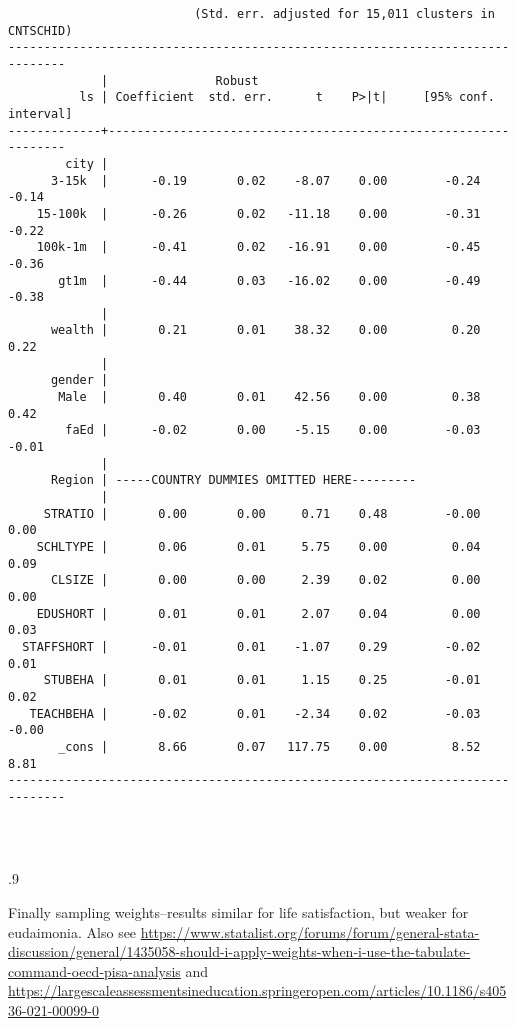 \documentclass[11pt, letterpaper]{article}
\begin{document}
\begin{spacing}{1.9}
\begin{spacing}{.5}
\begin{scriptsize}
\begin{verbatim}
                          (Std. err. adjusted for 15,011 clusters in CNTSCHID)
------------------------------------------------------------------------------
             |               Robust
          ls | Coefficient  std. err.      t    P>|t|     [95% conf. interval]
-------------+----------------------------------------------------------------
        city |
      3-15k  |      -0.19       0.02    -8.07    0.00        -0.24       -0.14
    15-100k  |      -0.26       0.02   -11.18    0.00        -0.31       -0.22
    100k-1m  |      -0.41       0.02   -16.91    0.00        -0.45       -0.36
       gt1m  |      -0.44       0.03   -16.02    0.00        -0.49       -0.38
             |
      wealth |       0.21       0.01    38.32    0.00         0.20        0.22
             |
      gender |
       Male  |       0.40       0.01    42.56    0.00         0.38        0.42
        faEd |      -0.02       0.00    -5.15    0.00        -0.03       -0.01
             |
      Region | -----COUNTRY DUMMIES OMITTED HERE---------
             |
     STRATIO |       0.00       0.00     0.71    0.48        -0.00        0.00
    SCHLTYPE |       0.06       0.01     5.75    0.00         0.04        0.09
      CLSIZE |       0.00       0.00     2.39    0.02         0.00        0.00
    EDUSHORT |       0.01       0.01     2.07    0.04         0.00        0.03
  STAFFSHORT |      -0.01       0.01    -1.07    0.29        -0.02        0.01
     STUBEHA |       0.01       0.01     1.15    0.25        -0.01        0.02
   TEACHBEHA |      -0.02       0.01    -2.34    0.02        -0.03       -0.00
       _cons |       8.66       0.07   117.75    0.00         8.52        8.81
------------------------------------------------------------------------------




\end{verbatim}
\end{scriptsize}
\end{spacing}{.9}

Finally sampling weights--results similar for life satisfaction, but weaker for
 eudaimonia. Also see
\url{https://www.statalist.org/forums/forum/general-stata-discussion/general/1435058-should-i-apply-weights-when-i-use-the-tabulate-command-oecd-pisa-analysis}
and \url{https://largescaleassessmentsineducation.springeropen.com/articles/10.1186/s40536-021-00099-0}

\begin{spacing}{.5}
\begin{scriptsize}
\begin{verbatim}


\end{verbatim}
\end{scriptsize}
\end{spacing}
\end{spacing}
\end{document}
